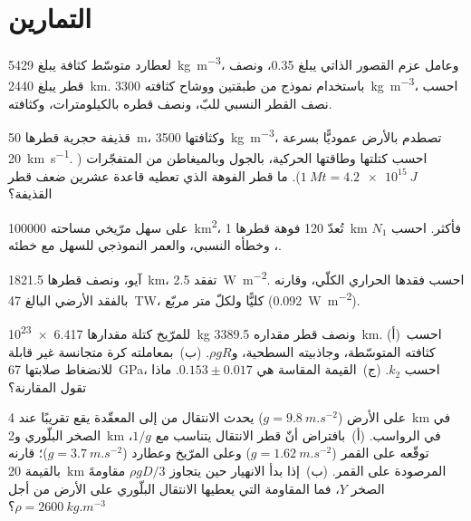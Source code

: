 \section{التمارين}

\begin{exercise}[$\star$]\label{exo:b3:planetary-interiors-surfaces:1}
لعطارد متوسّط كثافة يبلغ \qty{5429}{kg.m^{-3}}، وعامل عزم القصور الذاتي
يبلغ 0.35، ونصف قطر يبلغ \qty{2440}{km}. باستخدام نموذج من طبقتين ووشاح
كثافته \qty{3300}{kg.m^{-3}}، احسب نصف القطر النسبي للبّ،
ونصف قطره بالكيلومترات، وكثافته.
\end{exercise}

\begin{exercise}[$\star$]\label{exo:b3:planetary-interiors-surfaces:2}
قذيفة حجرية قطرها \qty{50}{m}، وكثافتها \qty{3500}{kg.m^{-3}}،
تصطدم بالأرض عموديًّا بسرعة \qty{20}{km.s^{-1}}. احسب كتلتها وطاقتها الحركية،
بالجول وبالميغاطن من المتفجّرات
($\qty{1}{Mt} = \qty{4.2e15}{J}$). ما قطر الفوهة الذي تعطيه قاعدة
عشرين ضعف قطر القذيفة؟
\end{exercise}

\begin{exercise}[$\star$]\label{exo:b3:planetary-interiors-surfaces:3}
على سهل مرّيخي مساحته \qty{100000}{km^2}، تُعدّ 120 فوهة قطرها
\qty{1}{km} فأكثر. احسب $N_1$، وخطأه النسبي، والعمر النموذجي للسهل
مع خطئه.
\end{exercise}

\begin{exercise}[$\star$]\label{exo:b3:planetary-interiors-surfaces:4}
آيو، ونصف قطرها \qty{1821.5}{km}، تفقد \qty{2.5}{W.m^{-2}}. احسب فقدها الحراري
الكلّي، وقارنه بالفقد الأرضي البالغ \qty{47}{TW}، كليًّا
ولكلّ متر مربّع (\qty{0.092}{W.m^{-2}}).
\end{exercise}

\begin{exercise}[$\star\star$]\label{exo:b3:planetary-interiors-surfaces:5}
للمرّيخ كتلة مقدارها \qty{6.417e23}{kg} ونصف قطر مقداره \qty{3389.5}{km}.
(أ)~احسب كثافته المتوسّطة، وجاذبيته السطحية، و$\rho gR$.
(ب)~بمعاملته كرة متجانسة غير قابلة للانضغاط صلابتها
\qty{67}{GPa}، احسب  $k_2$. (ج)~القيمة المقاسة هي
$0.153 \pm 0.017$. ماذا تقول المقارنة؟
\end{exercise}

\begin{exercise}[$\star\star$]\label{exo:b3:planetary-interiors-surfaces:6}
على الأرض ($g = \qty{9.8}{m.s^{-2}}$) يحدث الانتقال من  إلى المعقّدة
يقع تقريبًا عند \qty{4}{km} في الصخر البلّوري و\qty{2}{km} في
الرواسب. (أ)~بافتراض أنّ قطر الانتقال يتناسب مع $1/g$،
توقّعه على القمر ($g = \qty{1.62}{m.s^{-2}}$) وعلى المرّيخ
وعطارد ($g = \qty{3.7}{m.s^{-2}}$)؛ قارنه بالقيمة \qty{20}{km}
المرصودة على القمر. (ب)~إذا بدأ الانهيار حين يتجاوز $\rho gD/3$
مقاومةَ الصخر $Y$، فما المقاومة التي يعطيها الانتقال البلّوري
على الأرض من أجل $\rho = \qty{2600}{kg.m^{-3}}$؟
\end{exercise}

